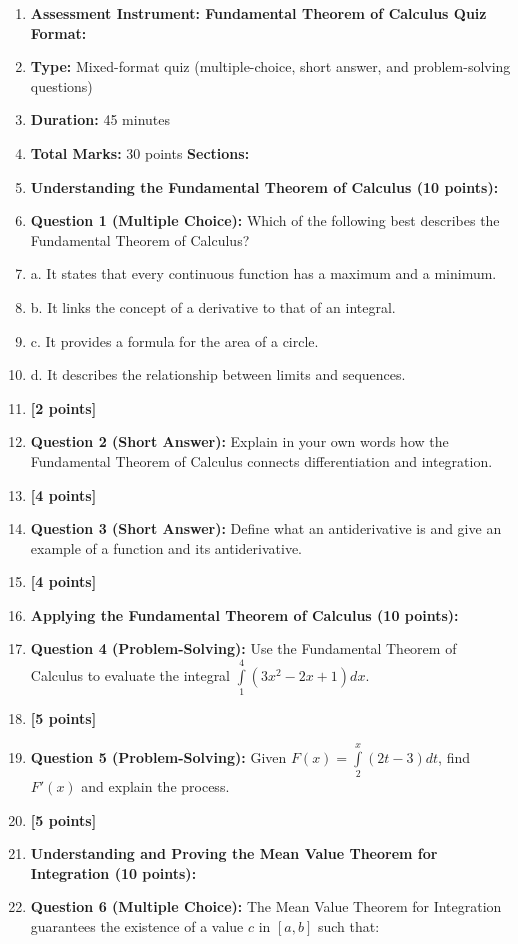 \begin{enumerate}
    \item \textbf{Assessment Instrument: Fundamental Theorem of Calculus Quiz} \textbf{Format:}
    \item \textbf{Type:} Mixed-format quiz (multiple-choice, short answer, and problem-solving questions)
    \item \textbf{Duration:} 45 minutes
    \item \textbf{Total Marks:} 30 points \textbf{Sections:}
    \item \textbf{Understanding the Fundamental Theorem of Calculus (10 points):}
    \item \textbf{Question 1 (Multiple Choice):} Which of the following best describes the Fundamental Theorem of Calculus?
    \item a. It states that every continuous function has a maximum and a minimum.
    \item b. It links the concept of a derivative to that of an integral.
    \item c. It provides a formula for the area of a circle.
    \item d. It describes the relationship between limits and sequences.
    \item \textbf{[2 points]}
    \item \textbf{Question 2 (Short Answer):} Explain in your own words how the Fundamental Theorem of Calculus connects differentiation and integration.
    \item \textbf{[4 points]}
    \item \textbf{Question 3 (Short Answer):} Define what an antiderivative is and give an example of a function and its antiderivative.
    \item \textbf{[4 points]}
    \item \textbf{Applying the Fundamental Theorem of Calculus (10 points):}
    \item \textbf{Question 4 (Problem-Solving):} Use the Fundamental Theorem of Calculus to evaluate the integral $\int\limits_1^4 (3x^2 - 2x + 1)dx$.
    \item \textbf{[5 points]}
    \item \textbf{Question 5 (Problem-Solving):} Given $F(x) = \int\limits_2^x (2t - 3)dt$, find $F'(x)$ and explain the process.
    \item \textbf{[5 points]}
    \item \textbf{Understanding and Proving the Mean Value Theorem for Integration (10 points):}
    \item \textbf{Question 6 (Multiple Choice):} The Mean Value Theorem for Integration guarantees the existence of a value $c$ in $[a,b]$ such that:

\end{enumerate}
